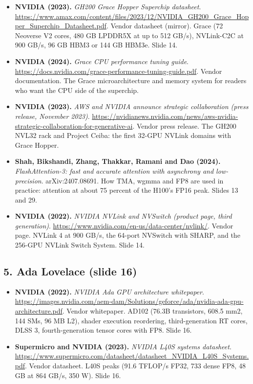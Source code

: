\begin{itemize}[leftmargin=1.2em,itemsep=3pt]
\item \textbf{NVIDIA (2023).} \textit{GH200 Grace Hopper Superchip datasheet}. \url{https://www.amax.com/content/files/2023/12/NVIDIA_GH200_Grace_Hopper_Superchip_Datasheet.pdf}. Vendor datasheet (mirror). Grace (72 Neoverse V2 cores, 480 GB LPDDR5X at up to 512 GB/s), NVLink-C2C at 900 GB/s, 96 GB HBM3 or 144 GB HBM3e. Slide 14.
\item \textbf{NVIDIA (2024).} \textit{Grace CPU performance tuning guide}. \url{https://docs.nvidia.com/grace-performance-tuning-guide.pdf}. Vendor documentation. The Grace microarchitecture and memory system for readers who want the CPU side of the superchip.
\item \textbf{NVIDIA (2023).} \textit{AWS and NVIDIA announce strategic collaboration (press release, November 2023)}. \url{https://nvidianews.nvidia.com/news/aws-nvidia-strategic-collaboration-for-generative-ai}. Vendor press release. The GH200 NVL32 rack and Project Ceiba: the first 32-GPU NVLink domains with Grace Hopper.
\item \textbf{Shah, Bikshandi, Zhang, Thakkar, Ramani and Dao (2024).} \textit{FlashAttention-3: fast and accurate attention with asynchrony and low-precision}. arXiv:2407.08691. How TMA, wgmma and FP8 are used in practice: attention at about 75 percent of the H100's FP16 peak. Slides 13 and 29.
\item \textbf{NVIDIA (2022).} \textit{NVIDIA NVLink and NVSwitch (product page, third generation)}. \url{https://www.nvidia.com/en-us/data-center/nvlink/}. Vendor page. NVLink 4 at 900 GB/s, the 64-port NVSwitch with SHARP, and the 256-GPU NVLink Switch System. Slide 14.
\end{itemize}
\subsection*{5. Ada Lovelace (slide 16)}
\begin{itemize}[leftmargin=1.2em,itemsep=3pt]\sloppy
\item \textbf{NVIDIA (2022).} \textit{NVIDIA Ada GPU architecture whitepaper}. \url{https://images.nvidia.com/aem-dam/Solutions/geforce/ada/nvidia-ada-gpu-architecture.pdf}. Vendor whitepaper. AD102 (76.3B transistors, 608.5 mm2, 144 SMs, 96 MB L2), shader execution reordering, third-generation RT cores, DLSS 3, fourth-generation tensor cores with FP8. Slide 16.
\item \textbf{Supermicro and NVIDIA (2023).} \textit{NVIDIA L40S systems datasheet}. \url{https://www.supermicro.com/datasheet/datasheet_NVIDIA_L40S_Systems.pdf}. Vendor datasheet. L40S peaks (91.6 TFLOP/s FP32, 733 dense FP8, 48 GB at 864 GB/s, 350 W). Slide 16.
\end{itemize}
